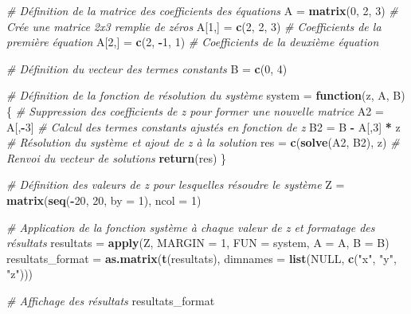 \documentclass[
]{article}
\newenvironment{Shaded}{\begin{snugshade}}{\end{snugshade}}
\newcommand{\AttributeTok}[1]{\textcolor[rgb]{0.13,0.29,0.53}{#1}}
\newcommand{\CommentTok}[1]{\textcolor[rgb]{0.56,0.35,0.01}{\textit{#1}}}
\newcommand{\ConstantTok}[1]{\textcolor[rgb]{0.56,0.35,0.01}{#1}}
\newcommand{\ControlFlowTok}[1]{\textcolor[rgb]{0.13,0.29,0.53}{\textbf{#1}}}
\newcommand{\DecValTok}[1]{\textcolor[rgb]{0.00,0.00,0.81}{#1}}
\newcommand{\FunctionTok}[1]{\textcolor[rgb]{0.13,0.29,0.53}{\textbf{#1}}}
\newcommand{\NormalTok}[1]{#1}
\newcommand{\OtherTok}[1]{\textcolor[rgb]{0.56,0.35,0.01}{#1}}
\newcommand{\SpecialCharTok}[1]{\textcolor[rgb]{0.81,0.36,0.00}{\textbf{#1}}}
\newcommand{\StringTok}[1]{\textcolor[rgb]{0.31,0.60,0.02}{#1}}
\begin{document}
\begin{Shaded}
\begin{Highlighting}[]
\CommentTok{\# Définition de la matrice des coefficients des équations}
\NormalTok{A }\OtherTok{=} \FunctionTok{matrix}\NormalTok{(}\DecValTok{0}\NormalTok{, }\DecValTok{2}\NormalTok{, }\DecValTok{3}\NormalTok{)  }\CommentTok{\# Crée une matrice 2x3 remplie de zéros}
\NormalTok{A[}\DecValTok{1}\NormalTok{,] }\OtherTok{=} \FunctionTok{c}\NormalTok{(}\DecValTok{2}\NormalTok{, }\DecValTok{2}\NormalTok{, }\DecValTok{3}\NormalTok{)   }\CommentTok{\# Coefficients de la première équation}
\NormalTok{A[}\DecValTok{2}\NormalTok{,] }\OtherTok{=} \FunctionTok{c}\NormalTok{(}\DecValTok{2}\NormalTok{, }\SpecialCharTok{{-}}\DecValTok{1}\NormalTok{, }\DecValTok{1}\NormalTok{)  }\CommentTok{\# Coefficients de la deuxième équation}

\CommentTok{\# Définition du vecteur des termes constants}
\NormalTok{B }\OtherTok{=} \FunctionTok{c}\NormalTok{(}\DecValTok{0}\NormalTok{, }\DecValTok{4}\NormalTok{)}

\CommentTok{\# Définition de la fonction de résolution du système}
\NormalTok{system }\OtherTok{=} \ControlFlowTok{function}\NormalTok{(z, A, B) \{}
  \CommentTok{\# Suppression des coefficients de z pour former une nouvelle matrice}
\NormalTok{  A2 }\OtherTok{=}\NormalTok{ A[,}\SpecialCharTok{{-}}\DecValTok{3}\NormalTok{]}
  \CommentTok{\# Calcul des termes constants ajustés en fonction de z}
\NormalTok{  B2 }\OtherTok{=}\NormalTok{ B }\SpecialCharTok{{-}}\NormalTok{ A[,}\DecValTok{3}\NormalTok{] }\SpecialCharTok{*}\NormalTok{ z}
  \CommentTok{\# Résolution du système et ajout de z à la solution}
\NormalTok{  res }\OtherTok{=} \FunctionTok{c}\NormalTok{(}\FunctionTok{solve}\NormalTok{(A2, B2), z)}
  \CommentTok{\# Renvoi du vecteur de solutions}
  \FunctionTok{return}\NormalTok{(res)}
\NormalTok{\}}

\CommentTok{\# Définition des valeurs de z pour lesquelles résoudre le système}
\NormalTok{Z }\OtherTok{=} \FunctionTok{matrix}\NormalTok{(}\FunctionTok{seq}\NormalTok{(}\SpecialCharTok{{-}}\DecValTok{20}\NormalTok{, }\DecValTok{20}\NormalTok{, }\AttributeTok{by =} \DecValTok{1}\NormalTok{), }\AttributeTok{ncol =} \DecValTok{1}\NormalTok{)}

\CommentTok{\# Application de la fonction système à chaque valeur de z et formatage des résultats}
\NormalTok{resultats }\OtherTok{=} \FunctionTok{apply}\NormalTok{(Z, }\AttributeTok{MARGIN =} \DecValTok{1}\NormalTok{, }\AttributeTok{FUN =}\NormalTok{ system, }\AttributeTok{A =}\NormalTok{ A, }\AttributeTok{B =}\NormalTok{ B)}
\NormalTok{resultats\_format }\OtherTok{=} \FunctionTok{as.matrix}\NormalTok{(}\FunctionTok{t}\NormalTok{(resultats), }\AttributeTok{dimnames =} \FunctionTok{list}\NormalTok{(}\ConstantTok{NULL}\NormalTok{, }\FunctionTok{c}\NormalTok{(}\StringTok{"x"}\NormalTok{, }\StringTok{"y"}\NormalTok{, }\StringTok{"z"}\NormalTok{)))}

\CommentTok{\# Affichage des résultats}
\NormalTok{resultats\_format}
\end{Highlighting}
\end{Shaded}
\end{document}
